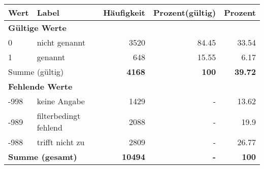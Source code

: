      \begin{longtable}{lXrrr}
     \toprule
     \textbf{Wert} & \textbf{Label} & \textbf{Häufigkeit} & \textbf{Prozent(gültig)} & \textbf{Prozent} \\
     \endhead
     \midrule
     \multicolumn{5}{l}{\textbf{Gültige Werte}}\\

     0 &
     \multicolumn{1}{X}{ nicht genannt   } &


       \num{3520} &
       \num[round-mode=places,round-precision=2]{84,45} &
         \num[round-mode=places,round-precision=2]{33,54} \\

     1 &
     \multicolumn{1}{X}{ genannt   } &


       \num{648} &
       \num[round-mode=places,round-precision=2]{15,55} &
         \num[round-mode=places,round-precision=2]{6,17} \\
     \midrule
     \multicolumn{2}{l}{Summe (gültig)} &
       \textbf{\num{4168}} &
     \textbf{100} &
       \textbf{\num[round-mode=places,round-precision=2]{39,72}} \\
     \multicolumn{5}{l}{\textbf{Fehlende Werte}}\\
       -998 &
       keine Angabe &
         \num{1429} &
        - &
         \num[round-mode=places,round-precision=2]{13,62} \\
       -989 &
       filterbedingt fehlend &
         \num{2088} &
        - &
         \num[round-mode=places,round-precision=2]{19,9} \\
       -988 &
       trifft nicht zu &
         \num{2809} &
        - &
         \num[round-mode=places,round-precision=2]{26,77} \\
     \midrule
     \multicolumn{2}{l}{\textbf{Summe (gesamt)}} &
          \textbf{\num{10494}} &
        \textbf{-} &
        \textbf{100} \\
     \bottomrule
     \end{longtable}
     
